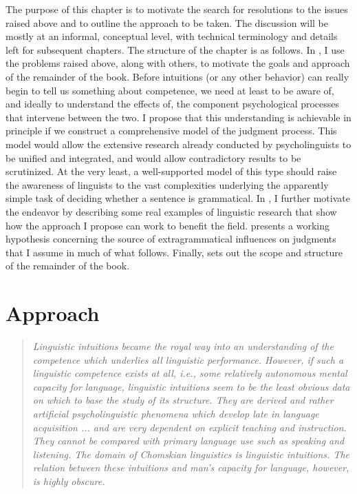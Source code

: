  
The purpose of this chapter is to motivate the search for resolutions to the issues raised above and to outline the approach to be taken. The discussion will be mostly at an informal, conceptual level, with technical terminology and details left for subsequent chapters. The structure of the chapter is as follows. In , I use the problems raised above, along with others, to motivate the goals and approach of the remainder of the book. Before intuitions (or any other behavior) can really begin to tell us something about competence, we need at least to be aware of, and ideally to understand the effects of, the component psychological processes that intervene between the two. I propose that this understanding is achievable in principle if we construct a comprehensive model of the judgment process. This model would allow the extensive research already conducted by psycholinguists to be unified and integrated, and would allow contradictory results to be scrutinized. At the very least, a well-supported model of this type should raise the awareness of linguists to the vast complexities underlying the apparently simple task of deciding whether a sentence is grammatical. In , I further motivate the endeavor by describing some real examples of linguistic research that show how the approach I propose can work to benefit the field.  presents a working hypothesis concerning the source of extragrammatical influences on judgments that I assume in much of what follows. Finally,  sets out the scope and structure of the remainder of the book.

\section{Approach} \label{sec:1.2} 
\begin{quote}\itshape Linguistic intuitions became the royal way into an understanding of the competence which underlies all linguistic performance.  However, if such a linguistic competence exists at all, i.e., some relatively autonomous mental capacity for  language, linguistic intuitions seem to be the least obvious data on which to base the study of its structure. They are derived and rather artificial psycholinguistic  phenomena  which develop late in language acquisition ... and are very dependent on explicit teaching and instruction. They cannot be compared with primary  language use such as speaking and listening. The  domain of Chomskian linguistics is linguistic intuitions. The relation between these intuitions and man's capacity for  language, however, is highly obscure.\\[-2\baselineskip]\begin{flushright}\upshape\citep{LeveltEtAl1977}\end{flushright}
\end{quote}

